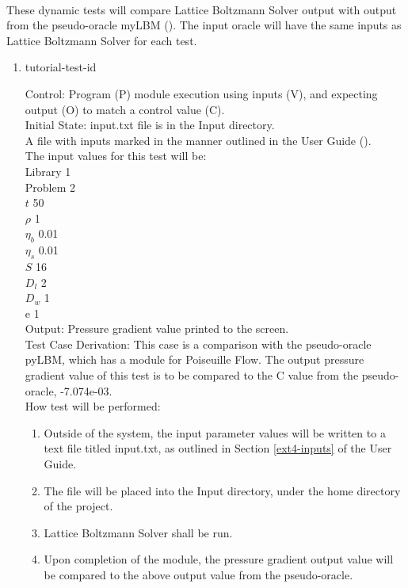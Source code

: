 \documentclass[12pt, titlepage]{article}
\newcommand{\famname}{Lattice Boltzmann Solver}
\newcounter{testcounter} %
\begin{document}
\paragraph{} These dynamic tests will compare {\famname} output with output from
the pseudo-oracle myLBM (\citet{pylbmcode}). The input oracle will have the same
inputs as {\famname} for each test.

\begin{enumerate}

\item{tutorial-test-id\thetestcounter \\}

Control: Program (P) module execution using inputs (V), and expecting output (O) to match a control value (C).\\
					
Initial State: input.txt file is in the Input directory.\\
					
A file with inputs marked in the manner outlined in the User
Guide (\citet{LBM_UserGuide_PM}).\\The input values for this test will be:\\
  Library 1\\
Problem 2\\
$t$ 50\\
$\rho$ 1\\
$\eta_b$ 0.01\\
$\eta_s$ 0.01\\
$S$ 16\\
$D_{l}$ 2\\
$D_{w}$ 1\\
$\mathrm{e}$ 1\\

					
Output: Pressure gradient value printed to the screen.  \\

Test Case Derivation: This case is a comparison with the pseudo-oracle pyLBM,
which has a module for Poiseuille Flow. The output pressure gradient value of
this test is to be compared to the C value from the pseudo-oracle,
-7.074e-03.\\
					
How test will be performed: 

\begin{enumerate}
\item Outside of the system, the input parameter values will be written to a text file titled input.txt, as outlined in Section \ref{ext4-inputs} of the User Guide.
\item The file will be placed into the Input directory, under the home directory
of the project.
\item {\famname} shall be run.
\item Upon completion of the module, the pressure gradient output value will be
compared to the above output value from the pseudo-oracle.
\end{enumerate}			


\end{enumerate}
\end{document}

